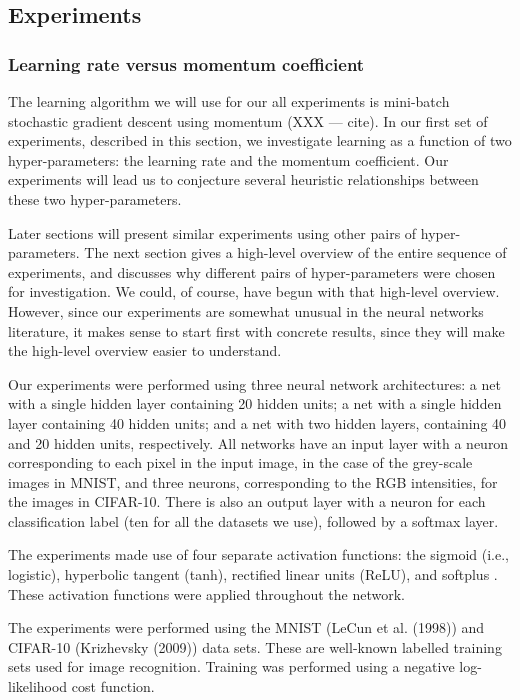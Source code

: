 \documentclass[10pt]{article}
\begin{document}
\subsection*{Experiments}

\subsubsection*{Learning rate versus momentum coefficient}

The learning algorithm we will use for our all experiments is
mini-batch stochastic gradient descent using momentum (XXX --- cite).
In our first set of experiments, described in this section, we
investigate learning as a function of two hyper-parameters: the
learning rate and the momentum coefficient.  Our experiments will lead
us to conjecture several heuristic relationships between these two
hyper-parameters.

Later sections will present similar experiments using other pairs of
hyper-parameters.  The next section gives a high-level overview of the
entire sequence of experiments, and discusses why different pairs of
hyper-parameters were chosen for investigation.  We could, of course,
have begun with that high-level overview.  However, since our
experiments are somewhat unusual in the neural networks literature, it
makes sense to start first with concrete results, since they will make
the high-level overview easier to understand.

Our experiments were performed using three neural network
architectures: a net with a single hidden layer containing 20 hidden
units; a net with a single hidden layer containing 40 hidden units;
and a net with two hidden layers, containing 40 and 20 hidden units,
respectively. All networks have an input layer with a neuron
corresponding to each pixel in the input image, in the case of the
grey-scale images in MNIST, and three neurons, corresponding to the
RGB intensities, for the images in CIFAR-10.  There is also an output
layer with a neuron for each classification label (ten for all the
datasets we use), followed by a softmax layer.

The experiments made use of four separate activation functions: the
sigmoid (i.e., logistic), hyperbolic tangent (tanh), rectified linear
units (ReLU), and softplus \cite{Glorot2010a,Dugas2001a}.  These
activation functions were applied throughout the network.

The experiments were performed using the MNIST (LeCun et al. (1998))
and CIFAR-10 (Krizhevsky (2009)) data sets.  These are well-known
labelled training sets used for image recognition.  Training was
performed using a negative log-likelihood cost function.
\end{document}

